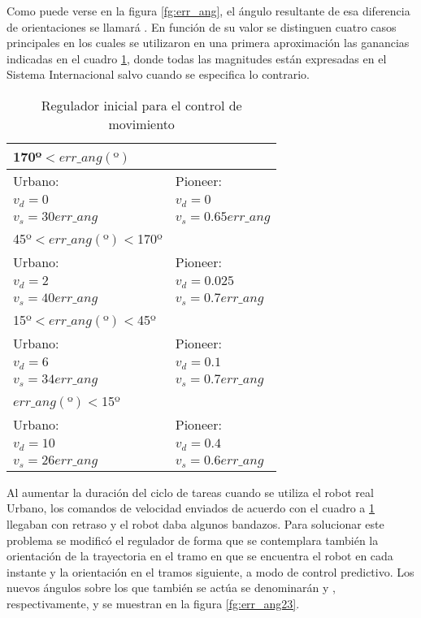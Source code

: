 Como puede verse en la figura \ref{fg:err_ang}, el ángulo resultante de esa diferencia de orientaciones se llamará . En función de su valor se distinguen cuatro casos principales en los cuales se utilizaron en una primera aproximación las ganancias indicadas en el cuadro \ref{vel1}, donde todas las magnitudes están expresadas en el Sistema Internacional salvo cuando se especifica lo contrario.

\begin{table}[hbt]
\begin{center}
\caption{Regulador inicial para el control de movimiento} \label{vel1}

\vspace{5mm}

\begin{tabular}{ll}
\hline\hline
170º$<err\_ang(º)$ \\ \hline
Urbano:      &  Pioneer:   \\
        $v_{d}=0$                   & $v_{d}=0$\\
        $v_{s}=30err\_ang$  & $v_{s}=0.65err\_ang$ \\
\hline
  45º$<err\_ang(º)<$170º \\ \hline
Urbano:  & Pioneer:\\
        $v_{d}=2$                  & $v_{d}=0.025$\\
        $v_{s}=40err\_ang$ & $v_{s}=0.7err\_ang$\\
\hline
15º$<err\_ang(º)<$45º \\ \hline
Urbano:      &  Pioneer:   \\
        $v_{d}=6$                  & $v_{d}=0.1$\\
        $v_{s}=34err\_ang$ & $v_{s}=0.7err\_ang$ \\
\hline
$err\_ang(º)<$15º \\ \hline
Urbano:  & Pioneer: \\
        $v_{d}=10$                & $v_{d}=0.4$\\
        $v_{s}=26err\_ang$ & $v_{s}=0.6err\_ang$\\
\hline\hline
\end{tabular}
\end{center}
\end{table}

Al aumentar la duración del ciclo de tareas cuando se utiliza el robot real Urbano, los comandos de velocidad enviados de acuerdo con el cuadro a \ref{vel1} llegaban con retraso y el robot daba algunos bandazos. Para solucionar este problema se modificó el regulador de forma que se contemplara también la orientación de la trayectoria en el tramo en que se encuentra el robot en cada instante y la orientación en el tramos siguiente, a modo de control predictivo. Los nuevos ángulos sobre los que también se actúa se denominarán  y , respectivamente, y se muestran en la figura \ref{fg:err_ang23}.
 
